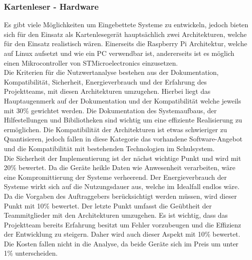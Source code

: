 \subsubsection{Kartenleser - Hardware}
Es gibt viele Möglichkeiten um Eingebettete Systeme zu entwickeln, jedoch bieten sich für den Einsatz als Kartenlesegerät hauptsächlich zwei Architekturen, welche für den Einsatz realistisch wären. Einerseits die Raspberry Pi Architektur, welche auf Linux aufsetzt und wie ein PC verwendbar ist, andererseits ist es möglich einen Mikrocontroller von STMicroelectronics einzusetzen.
\vspace{0.2cm}\\
Die Kriterien für die Nutzwertanalyse bestehen aus der Dokumentation, Kompatibilität, Sicherheit, Energieverbrauch und der Erfahrung des Projektteams, mit diesen Architekturen umzugehen. Hierbei liegt das Hauptaugenmerk auf der Dokumentation und der Kompatibilität welche jeweils mit 30\% gewichtet werden. Die Dokumentation des Systemaufbaus, der Hilfestellungen und Bibiliotheken sind wichtig um eine effiziente Realisierung zu ermöglichen. Die Kompatibilität der Architekturen ist etwas schwieriger zu Quantisieren, jedoch fallen in diese Kategorie das vorhandene Software-Angebot und die Kompatibilität mit bestehenden Technologien im Schulsystem.\vspace{0.2cm}\\
Die Sicherheit der Implementierung ist der nächst wichtige Punkt und wird mit 20\% bewertet. Da die Geräte heikle Daten wie Anwesenheit verarbeiten, wäre eine Kompromittierung der Systeme verheerend. Der Energieverbrauch der Systeme wirkt sich auf die Nutzungsdauer aus, welche im Idealfall endlos wäre. Da die Vorgaben des Auftraggebers berücksichtigt werden müssen, wird dieser Punkt mit 10\% bewertet. Der letzte Punkt umfasst die Geübtheit der Teammitglieder mit den Architekturen umzugehen. Es ist wichtig, dass das Projektteam bereits Erfahrung besitzt um Fehler vorzubeugen und die Effizienz der Entwicklung zu steigern. Daher wird auch dieser Aspekt mit 10\% bewertet.\vspace{0.2cm}\\ Die Kosten fallen nicht in die Analyse, da beide Geräte sich im Preis um unter 1\% unterscheiden.\\
